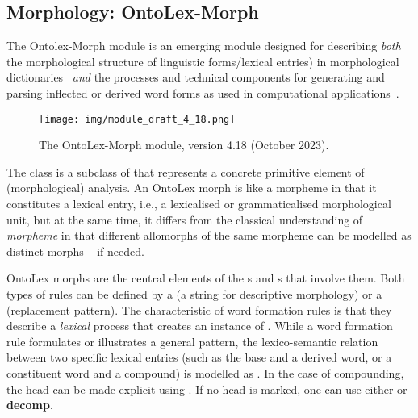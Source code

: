 \documentclass[output=paper,colorlinks,citecolor=brown]{langscibook}
\begin{document}
\subsection{Morphology: OntoLex-Morph} %
\label{section:ontolex-morph}

The Ontolex-Morph module is an emerging module designed for describing \emph{both} the morphological structure of linguistic forms/lexical entries) in morphological dictionaries~\citep{klimek2019challenges}
\emph{and} the processes and technical components for generating and parsing inflected or derived word forms as used in computational applications~\citep{chiarcos2022computational}.

\begin{figure}
    \texttt{[image: img/module\_draft\_4\_18.png]}
    \caption{The OntoLex-Morph module, version 4.18 (October 2023).}
    \label{fig-morph}
\end{figure}

The class  is a subclass of  that represents a concrete primitive element of (morphological) analysis.
An OntoLex morph is like a morpheme in that it constitutes a lexical entry, i.e., a lexicalised or grammaticalised morphological unit, but at the same time, it differs from the classical understanding of \emph{morpheme} in that different allomorphs of the same morpheme can be modelled as distinct morphs -- if needed.

OntoLex morphs are the central elements of the s and s that involve them.
Both types of rules can be defined by a  (a string for descriptive morphology) or a  (replacement pattern).
The characteristic of word formation rules is that they describe
a \emph{lexical} process that creates an instance of .
%
While a word formation rule formulates or illustrates a general pattern, the lexico-semantic relation between two specific lexical entries (such as the base and a derived word, or a constituent word and a compound) is modelled as . In the case of compounding, the head can be made explicit using . If no head is marked, one can use either  or \textbf{decomp}.
\end{document}
